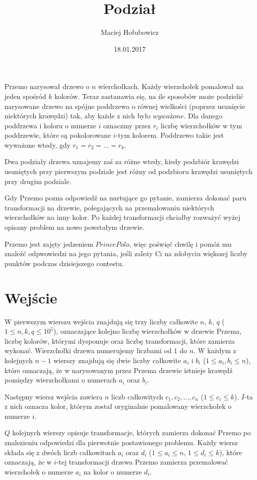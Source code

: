 \documentclass[zad,zawodnik,utf8]{sinol}
\title{Podział}
\author{Maciej Hołubowicz} %
\date{18.01.2017}
\begin{document}
\begin{tasktext}%

Przemo narysował drzewo o $n$ wierchołkach. Każdy wierzchołek pomalował na jeden spośród $k$ kolorów. Teraz zastanawia się, na ile sposobów może
podzielić narysowane drzewo na spójne poddrzewa o równej wielkości (poprzez usunięcie niektórych krawędzi) tak, aby każde z nich było $wyważone$. 
Dla danego poddrzewa i koloru o numerze $i$ oznaczmy przez $r_i$ liczbę wierzchołków w tym poddrzewie, które są pokolorowane $i$-tym kolorem.
Poddrzewo takie jest wyważone wtedy, gdy $r_1 = r_2 = \dots = r_k$. 

Dwa podziały drzewa uznajemy zaś za różne wtedy, kiedy podzbiór krawędzi
usuniętych przy pierwszym podziale jest różny od podzbioru krawędzi usuniętych przy drugim podziale.

Gdy Przemo pozna odpowiedź na nurtujące go pytanie, zamierza dokonać paru transformacji na drzewie, polegających na przemalowaniu niektórych wierzchołków
na inny kolor. Po każdej transformacji chciałby rozważyć wyżej opisany problem na nowo powstałym drzewie.

Przemo jest zajęty jedzeniem $Prince Polo$, więc poświęć chwilę i pomóż mu znaleźć odpwowiedzi na jego pytania, jeśli zależy Ci na zdobyciu większej
liczby punktów podczas dzisiejszego contestu.

  \section{Wejście}
W pierwszym wierszu wejścia znajdują się trzy liczby całkowite $n$, $k$, $q$ ($1 \leq n, k, q \leq 10^5$), oznaczające kolejno liczbę wierzchołków
w drzewie Przema, liczbę kolorów, którymi dysponuje oraz liczbę transformacji, które zamierza wykonać. Wierzchołki drzewa numerujemy liczbami od $1$ do $n$.
W każdym z kolejnych $n-1$ wierszy znajdują się dwie liczby całkowite $a_i$ i $b_i$ ($1 \leq a_i, b_i \leq n$), które oznaczają, że w narysowanym przez Przema
drzewie istnieje krawędź pomiędzy wierzchołkami o numerach $a_i$ oraz $b_i$.

Następny wiersz wejścia zawiera $n$ liczb całkowitych $c_1, c_2, \dots, c_n$ ($1 \leq c_i \leq k$). $I$-ta z nich oznacza kolor, którym został oryginalnie pomalowany
wierzchołek o numerze $i$.

$Q$ kolejnych wierszy opisuje transformacje, których zamierza dokonać Przemo po znalezieniu odpowiedzi dla pierwotnie postawionego problemu.
Każdy wiersz składa się z dwóch liczb całkowituch $a_i$ oraz $d_i$ ($1 \leq a_i \leq n$, $1 \leq d_i \leq k$), które oznaczają, że w $i$-tej transformacji drzewa
Przemo zamierza przemalować wierzchołek o numerze $a_i$ na kolor o numerze $d_i$.


\end{tasktext}
\end{document}

